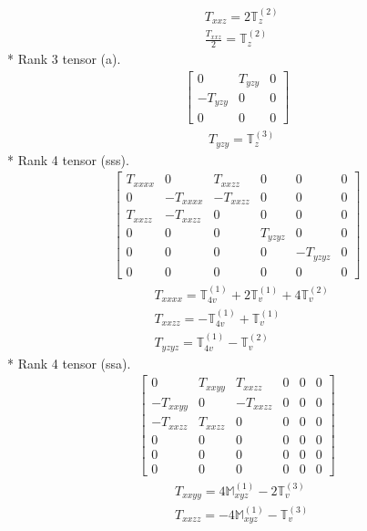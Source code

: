 \documentclass[fleqn,8pt,landscape]{jsarticle}
\begin{document}
\begin{align*}
& T_{xxz} = 2 \mathbb{T}_{z}^{(2)} \\
& \frac{T_{xxz}}{2} = \mathbb{T}_{z}^{(2)}
\end{align*}
* Rank 3 tensor (a).
\begin{align*}
\begin{bmatrix} 0 & T_{yzy} & 0 \\ - T_{yzy} & 0 & 0 \\ 0 & 0 & 0 \end{bmatrix}
\end{align*}
\begin{align*}
& T_{yzy} = \mathbb{T}_{z}^{(3)}
\end{align*}
* Rank 4 tensor (sss).
\begin{align*}
\begin{bmatrix} T_{xxxx} & 0 & T_{xxzz} & 0 & 0 & 0 \\ 0 & - T_{xxxx} & - T_{xxzz} & 0 & 0 & 0 \\ T_{xxzz} & - T_{xxzz} & 0 & 0 & 0 & 0 \\ 0 & 0 & 0 & T_{yzyz} & 0 & 0 \\ 0 & 0 & 0 & 0 & - T_{yzyz} & 0 \\ 0 & 0 & 0 & 0 & 0 & 0 \end{bmatrix}
\end{align*}
\begin{align*}
& T_{xxxx} = \mathbb{T}_{4v}^{(1)} + 2 \mathbb{T}_{v}^{(1)} + 4 \mathbb{T}_{v}^{(2)} \\
& T_{xxzz} = - \mathbb{T}_{4v}^{(1)} + \mathbb{T}_{v}^{(1)} \\
& T_{yzyz} = \mathbb{T}_{4v}^{(1)} - \mathbb{T}_{v}^{(2)}
\end{align*}
* Rank 4 tensor (ssa).
\begin{align*}
\begin{bmatrix} 0 & T_{xxyy} & T_{xxzz} & 0 & 0 & 0 \\ - T_{xxyy} & 0 & - T_{xxzz} & 0 & 0 & 0 \\ - T_{xxzz} & T_{xxzz} & 0 & 0 & 0 & 0 \\ 0 & 0 & 0 & 0 & 0 & 0 \\ 0 & 0 & 0 & 0 & 0 & 0 \\ 0 & 0 & 0 & 0 & 0 & 0 \end{bmatrix}
\end{align*}
\begin{align*}
& T_{xxyy} = 4 \mathbb{M}_{xyz}^{(1)} - 2 \mathbb{T}_{v}^{(3)} \\
& T_{xxzz} = - 4 \mathbb{M}_{xyz}^{(1)} - \mathbb{T}_{v}^{(3)}
\end{align*}
\end{document}
